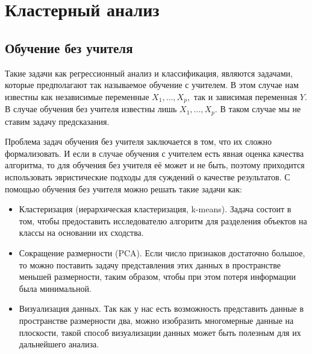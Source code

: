 \documentclass[article, 10pt]{disser}
\begin{document}
    

\date{\number\year}

\maketitle

\tableofcontents

\chapter{Кластерный анализ}
\section{Обучение без учителя}
Такие задачи как регрессионный анализ и классификация, являются задачами, которые предполагают так называемое обучение с учителем. В этом случае нам известны как независимые переменные $X_{1}, ... , X_{p},$ так и зависимая переменная $Y$. В случае обучения без учителя известны лишь $X_{1}, ... , X_{p}$. В таком случае мы не ставим задачу предсказания.

Проблема задач обучения без учителя заключается в том, что их сложно формализовать. И если в случае обучения с учителем есть явная оценка качества алгоритма, то для обучения без учителя её может и не быть, поэтому приходится использовать эвристические подходы для суждений о качестве результатов.
С помощью обучения без учителя можно решать такие задачи как:

\begin{itemize}

\item Кластеризация (иерархическая кластеризация, k-means). Задача состоит в том, чтобы предоставить исследователю алгоритм для разделения объектов на классы на основании их сходства.

\item Сокращение размерности (PCA). Если число признаков достаточно большое, то можно поставить задачу представления этих данных в пространстве меньшей размерности, таким образом, чтобы при этом потеря информации была минимальной.

\item Визуализация данных. Так как у нас есть возможность представить данные в пространстве размерности два, можно изобразить многомерные данные на плоскости, такой способ визуализации данных может быть полезным для их дальнейшего анализа.

\end{itemize}
\end{document}
